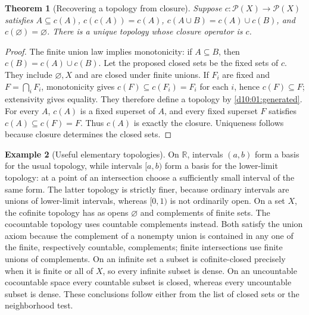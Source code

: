 \documentclass[11pt,oneside,openany]{book}
\newtheorem{theorem}{Theorem}[chapter]
\theoremstyle{definition}
\newtheorem{example}[theorem]{Example}
\theoremstyle{remark}
\newcommand{\R}{\mathbb R}\newcommand{\C}{\mathbb C}
\newcommand{\powset}{\mathcal P}
\begin{document}
\begin{theorem}[Recovering a topology from closure]\label{d10:01:kuratowski}
Suppose $c:\powset(X)\to\powset(X)$ satisfies $A\subseteq c(A)$, $c(c(A))=c(A)$, $c(A\cup B)=c(A)\cup c(B)$, and $c(\varnothing)=\varnothing$. There is a unique topology whose closure operator is $c$.
\end{theorem}
\begin{proof}
The finite union law implies monotonicity: if $A\subseteq B$, then $c(B)=c(A)\cup c(B)$. Let the proposed closed sets be the fixed sets of $c$. They include $\varnothing,X$ and are closed under finite unions. If $F_i$ are fixed and $F=\bigcap_i F_i$, monotonicity gives $c(F)\subseteq c(F_i)=F_i$ for each $i$, hence $c(F)\subseteq F$; extensivity gives equality. They therefore define a topology by \cref{d10:01:generated}. For every $A$, $c(A)$ is a fixed superset of $A$, and every fixed superset $F$ satisfies $c(A)\subseteq c(F)=F$. Thus $c(A)$ is exactly the closure. Uniqueness follows because closure determines the closed sets.
\end{proof}

\begin{example}[Useful elementary topologies]\label{d10:01:examples}
On $\R$, intervals $(a,b)$ form a basis for the usual topology, while intervals $[a,b)$ form a basis for the lower-limit topology: at a point of an intersection choose a sufficiently small interval of the same form. The latter topology is strictly finer, because ordinary intervals are unions of lower-limit intervals, whereas $[0,1)$ is not ordinarily open. On a set $X$, the cofinite topology has as opens $\varnothing$ and complements of finite sets. The cocountable topology uses countable complements instead. Both satisfy the union axiom because the complement of a nonempty union is contained in any one of the finite, respectively countable, complements; finite intersections use finite unions of complements. On an infinite set a subset is cofinite-closed precisely when it is finite or all of $X$, so every infinite subset is dense. On an uncountable cocountable space every countable subset is closed, whereas every uncountable subset is dense. These conclusions follow either from the list of closed sets or the neighborhood test.
\end{example}
\end{document}
